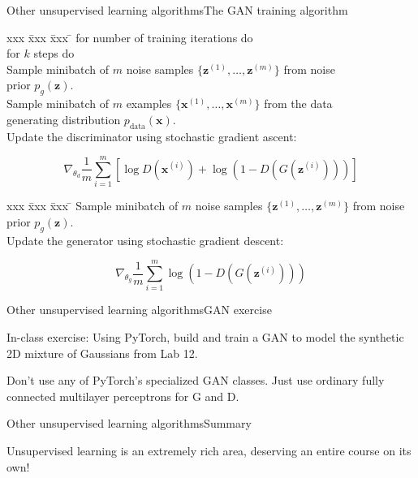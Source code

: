 \documentclass{beamer}
\begin{document}
\begin{frame}{Other unsupervised learning algorithms}{The GAN training algorithm}

  \begin{small}
  \begin{tabbing}
  xxx \= xxx \= xxx \= \kill
  for number of training iterations do \\
  \> for $k$ steps do \\
  \> \> Sample minibatch of $m$ noise samples $\{ \mathbf{z}^{(1)},\ldots,
        \mathbf{z}^{(m)} \}$ from noise \\
  \> \> \> prior $p_g(\mathbf{z})$.\\
  \> \> Sample minibatch of $m$ examples $\{ \mathbf{x}^{(1)},\ldots,
        \mathbf{x}^{(m)} \}$ from the data \\
  \> \> \> generating distribution $p_\text{data}(\mathbf{x})$. \\
  \> \> Update the discriminator using stochastic gradient ascent:
  \end{tabbing}
    $$ \nabla_{\theta_d} \frac{1}{m} \sum_{i=1}^m \left[
      \log D\left( \mathbf{x}^{(i)} \right) + \log \left( 1 - D\left(G\left(\mathbf{z}^{(i)}\right)\right)\right) \right]
    $$
  \begin{tabbing}
  xxx \= xxx \= xxx \= \kill
  \> Sample minibatch of $m$ noise samples $\{ \mathbf{z}^{(1)},\ldots,
        \mathbf{z}^{(m)} \}$ from noise prior $p_g(\mathbf{z})$. \\
  \> Update the generator using stochastic gradient descent:
  \end{tabbing}
    $$ \nabla_{\theta_g} \frac{1}{m} \sum_{i=1}^m
      \log \left( 1 - D\left( G \left( \mathbf{z}^{(i)} \right) \right)\right)
    $$

  \end{small}

\end{frame}


\begin{frame}{Other unsupervised learning algorithms}{GAN exercise}

  In-class exercise: Using PyTorch, build and train a GAN to model the
  synthetic 2D mixture of Gaussians from Lab 12.

  \medskip

  Don't use any of PyTorch's specialized GAN classes. Just use ordinary
  fully connected multilayer perceptrons for G and D.

\end{frame}


\begin{frame}{Other unsupervised learning algorithms}{Summary}

  Unsupervised learning is an extremely rich area, deserving an entire
  course on its own!

\end{frame}
\end{document}
